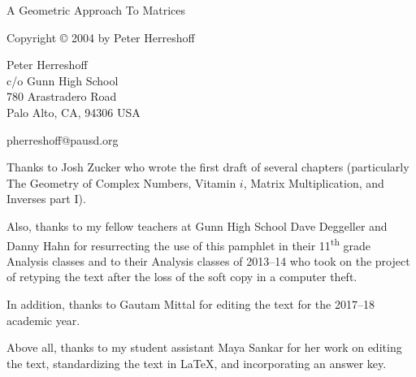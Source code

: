 \documentclass[../gatm.tex]{subfiles}
\begin{document}
\newcommand\dnew{\vspace{1cm}}

\begin{center}
\vspace*{\fill}

\doublespacing
A Geometric Approach To Matrices

Copyright \copyright{} 2004 by Peter Herreshoff

\vspace{1cm}

Peter Herreshoff\\
c/o Gunn High School\\
780 Arastradero Road\\
Palo Alto, CA, 94306 USA

\vspace{.5cm}

pherreshoff@pausd.org

\vspace{1cm}
\end{center}

\noindent Thanks to Josh Zucker who wrote the first draft of several chapters (particularly The Geometry of Complex Numbers, Vitamin $i$, Matrix Multiplication, and Inverses part I).

Also, thanks to my fellow teachers at Gunn High School Dave Deggeller and Danny Hahn for resurrecting the use of this pamphlet in their 11\textsuperscript{th} grade Analysis classes and to their Analysis classes of 2013--14 who took on the project of retyping the text after the loss of the soft copy in a computer theft.

In addition, thanks to Gautam Mittal for editing the text for the 2017--18 academic year.

Above all, thanks to my student assistant Maya Sankar for her work on editing the text, standardizing the text in \LaTeX{}, and incorporating an answer key.

\vspace*{\fill}
\end{document}
